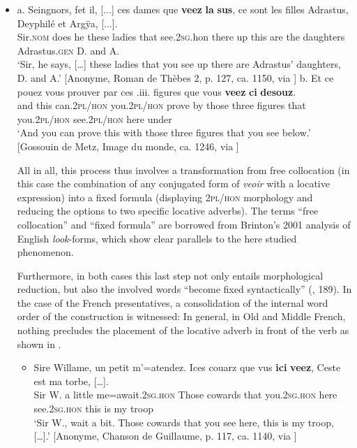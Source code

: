 \documentclass[output=paper]{langscibook}
\begin{document}
\begin{itemize}
\begin{itemize}
\begin{itemize}
\begin{itemize}
\begin{itemize}
\begin{itemize}
\begin{itemize}
\begin{itemize}
\item \gll \textup{a}. Seingnors, fet il, [...] ces dames que \textbf{veez} \textbf{la} \textbf{sus}, ce sont les filles Adrastus, Deyphilé et Argÿa, [...].\\
     Sir.\textsc{nom} does he these ladies that see.\textsc{2sg}.hon there up this are the daughters Adrastus.\textsc{gen} D. and A.\\
\glt ‘Sir, he says, […] these ladies that you see up there are Adrastus’ daughters, D. and A.’ [Anonyme, Roman de Thèbes 2, p. 127, ca. 1150, via \citealt{BFM2019}]
\z %
\gll \textup{b}. Et ce pouez vous prouver par ces .iii. figures que vous \textbf{veez} \textbf{ci} \textbf{desouz}.\\
     and this can.\textsc{2pl/hon} you.\textsc{2pl/hon} prove by those three figures that you.\textsc{2pl/hon} see.\textsc{2pl/hon} here under\\
\glt ‘And you can prove this with those three figures that you see below.’ [Gossouin de Metz, Image du monde, ca. 1246, via \citealt{BFM2022}]
\z %

All in all, this process thus involves a transformation from free collocation (in this case the combination of any conjugated form of \textit{veoir} with a locative expression) into a fixed formula (displaying \textsc{2pl/hon} morphology and reducing the options to two specific locative adverbs). The terms “free collocation” and “fixed formula” are borrowed from Brinton’s 2001 analysis of English \textit{look}{}-forms, which show clear parallels to the here studied phenomenon. 

Furthermore, in both cases this last step not only entails morphological reduction, but also the involved words “become fixed syntactically” (\citealt{Brinton2001}, 189). In the case of the French presentatives, a consolidation of the internal word order of the construction is witnessed: In general, in Old and Middle French, nothing precludes the placement of the locative adverb in front of the verb as shown in .

\begin{itemize}
\item \gll Sire Willame, un petit m'=atendez. Ices couarz que vus \textbf{ici} \textbf{veez}, Ceste est ma torbe, […].\\
     Sir W. a little me=await.\textsc{2sg.hon} Those cowards that you.\textsc{2sg.hon} here see.\textsc{2sg.hon} this is my troop\\
\glt ‘Sir W., wait a bit. Those cowards that you see here, this is my troop, […].’ [Anonyme, Chanson de Guillaume, p. 117, ca. 1140, via \citealt{BFM2019}]
\z %


\end{itemize}
\end{itemize}
\end{itemize}
\end{itemize}
\end{itemize}
\end{itemize}
\end{itemize}
\end{itemize}
\end{itemize}
\end{document}
